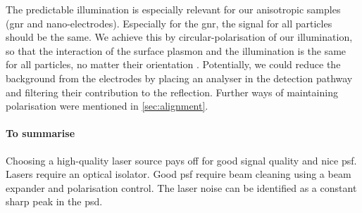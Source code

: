         The predictable illumination is especially relevant for our anisotropic samples (\gls{gnr} and nano-electrodes). Especially for the \gls{gnr}, the signal for all particles should be the same. We achieve this by circular-polarisation of our illumination, so that the interaction of the surface plasmon and the illumination is the same for all particles, no matter their orientation \cite{gaiduk2011correlated}. Potentially, we could reduce the background from the electrodes by placing an analyser in the detection pathway and filtering their contribution to the reflection. Further ways of maintaining polarisation were mentioned in \cref{sec:alignment}.
        \paragraph{To summarise} 
        Choosing a high-quality laser source pays off for good signal quality and nice \gls{psf}. Lasers require an optical isolator. Good \gls{psf} require beam cleaning using a beam expander and polarisation control. The laser noise can be identified as a constant sharp peak in the \gls{psd}.
    
